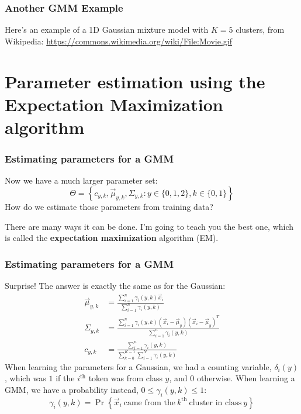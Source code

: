 \documentclass{beamer}
\begin{document}
\begin{frame}
  \frametitle{Another GMM Example}

  Here's an example of a 1D Gaussian mixture model with $K=5$ clusters,
  from Wikipedia:
  \url{https://commons.wikimedia.org/wiki/File:Movie.gif}
\end{frame}


\section[EM]{Parameter estimation using the Expectation  Maximization algorithm}
\setcounter{subsection}{1}

\begin{frame}
  \frametitle{Estimating parameters for a GMM}

  Now we have a much larger parameter set:
  \begin{displaymath}
    \Theta =\left\{c_{y,k},\vec\mu_{y,k},\Sigma_{y,k}:y\in\{0,1,2\},k\in\{0,1\}\right\}
  \end{displaymath}
  How do we estimate those parameters from training data?

  There are many ways it can be done.  I'm going to teach you the best
  one, which is called the {\bf expectation maximization} algorithm
  (EM).
\end{frame}

\begin{frame}
  \frametitle{Estimating parameters for a GMM}
  
  Surprise!  The answer is exactly the same as for the Gaussian:
  \begin{align*}
    \vec\mu_{y,k} &=
    \frac{\sum_{i=1}^n \gamma_i(y,k) \vec{x}_i}{\sum_{i=1}^n\gamma_i(y,k)}\\
    \Sigma_{y,k} &= \frac{\sum_{i=1}^n \gamma_i(y,k) (\vec{x}_i-\vec\mu_y)(\vec{x}_i-\vec\mu_y)^T}{\sum_{i=1}^n\gamma_i(y,k)}\\
    c_{y,k} &= \frac{\sum_{i=1}^n \gamma_i(y,k)}{\sum_{k=0}^{K-1}\sum_{i=1}^N\gamma_i(y,k)}
  \end{align*}
  When learning the parameters for a Gaussian, we had a counting variable,
  $\delta_i(y)$, which was $1$ if the $i^{\textrm{th}}$ token was from class $y$, and 0 otherwise.
  When learning a GMM, we have a probability instead, $0\le\gamma_i(y,k)\le 1$:
  \begin{displaymath}
    \gamma_i(y,k)=\Pr\left\{\vec{x}_i~\mbox{came from the}~k^{\textrm{th}}~\mbox{cluster in class}~y\right\}
  \end{displaymath}
\end{frame}
\end{document}
